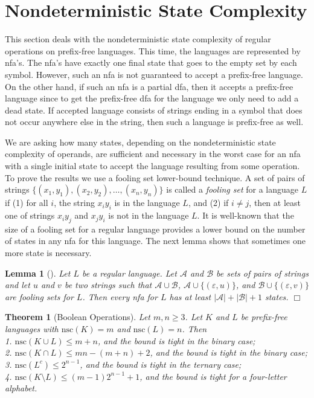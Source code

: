 \documentclass[copyright]{eptcs}
\newtheorem{theorem}{Theorem}
\newtheorem{lemma}{Lemma}
\newcommand{\eps}{\varepsilon}
\newcommand{\nsc}{\mathrm{nsc}}
\renewcommand{\le}{\leqslant}
\renewcommand{\ge}{\geqslant}
\begin{document}
 \section{Nondeterministic State Complexity}
 \label{***nondet}

 This section deals with the nondeterministic state complexity
 of regular operations on prefix-free languages.
 This time, the languages are represented by nfa's.
 The nfa's have exactly one final state that goes to the empty set by each symbol.
 However,  such an nfa is not guaranteed
 to accept a prefix-free language.
 On the other hand, if such an nfa is a partial dfa, 
 then it accepts a prefix-free language
 since to get the prefix-free dfa for the language 
 we only need to add a dead state.
 If accepted language consists of  strings ending in a symbol 
 that does not occur anywhere else in the string, 
 then such a language is prefix-free as well.

 We are asking how many states, depending 
 on the nondeterministic state complexity of operands, 
 are sufficient and necessary in the worst case for an nfa 
 with a single initial state
 to accept the language resulting from some operation.
 To prove the results we use
 a fooling set lower-bound technique. 
 A set of pairs of strings $\{(x_1,y_1),(x_2,y_2),\ldots,(x_n,y_n)\}$
 is called a \emph{fooling set} for a language $L$ if
 (1) for all $i$, the string $x_iy_i$ is in the language $L$, and
 (2) if $i\neq j$, then at least one of  strings
 $x_iy_j$ and $x_jy_i$ is not in the language $L$.
 It is well-known that the size of a fooling set for a regular language
 provides a lower bound on the number of states
 in any nfa for this language. 
 The next lemma shows that sometimes one more state is necessary.

 \begin{lemma}[\cite{jm10}]\label{le:fool}
  Let $L$ be a regular language.
  Let $\mathcal{A}$ and $\mathcal{B}$ be sets of pairs of strings
  and let $u$ and $v$ be two strings such that
  $\mathcal{A}\cup\mathcal{B}$,
  $\mathcal{A}\cup\{(\eps,u)\}$, and
  $\mathcal{B}\cup\{(\eps,v)\}$ are fooling sets for $L$.
  Then every nfa for $L$ has at least $|\mathcal{A}|+|\mathcal{B}|+1$ states.
 \hfill$\Box$
 \end{lemma}

 \begin{theorem}[Boolean Operations]\label{thm:boolean}
  Let $m,n\ge 3$. Let  $K$ and $L$
  be  prefix-free languages  with $\nsc(K)=m$ and $\nsc(L)=n$.
  Then \\
  1. $\nsc(K\cup L)\le m+n$, and the bound is tight in the binary case;\\
  2. $\nsc(K\cap L)\le mn-(m+n)+2$, and the bound is tight in the binary case;\\
  3. $\nsc(L^c)\le 2^{n-1}$,
     and the bound is tight in the ternary case;\\
  4. $\nsc(K\setminus L)\le (m-1)2^{n-1}+1$,
    and the bound is tight for a four-letter alphabet.
 \end{theorem}
\end{document}
